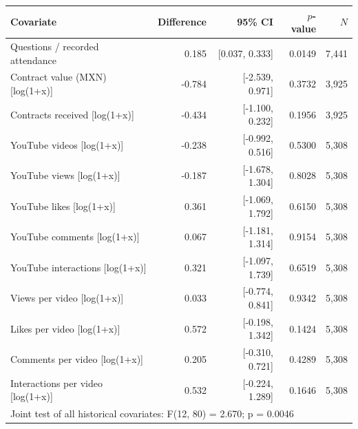 \begin{tabular}{lrrrr}
\toprule
Covariate & Difference & 95\% CI & $p$-value & $N$ \\
\midrule
Questions / recorded attendance & 0.185 & [0.037, 0.333] & 0.0149 & 7,441 \\
Contract value (MXN) [log(1+x)] & -0.784 & [-2.539, 0.971] & 0.3732 & 3,925 \\
Contracts received [log(1+x)] & -0.434 & [-1.100, 0.232] & 0.1956 & 3,925 \\
YouTube videos [log(1+x)] & -0.238 & [-0.992, 0.516] & 0.5300 & 5,308 \\
YouTube views [log(1+x)] & -0.187 & [-1.678, 1.304] & 0.8028 & 5,308 \\
YouTube likes [log(1+x)] & 0.361 & [-1.069, 1.792] & 0.6150 & 5,308 \\
YouTube comments [log(1+x)] & 0.067 & [-1.181, 1.314] & 0.9154 & 5,308 \\
YouTube interactions [log(1+x)] & 0.321 & [-1.097, 1.739] & 0.6519 & 5,308 \\
Views per video [log(1+x)] & 0.033 & [-0.774, 0.841] & 0.9342 & 5,308 \\
Likes per video [log(1+x)] & 0.572 & [-0.198, 1.342] & 0.1424 & 5,308 \\
Comments per video [log(1+x)] & 0.205 & [-0.310, 0.721] & 0.4289 & 5,308 \\
Interactions per video [log(1+x)] & 0.532 & [-0.224, 1.289] & 0.1646 & 5,308 \\
\midrule
\multicolumn{5}{l}{Joint test of all historical covariates: F(12, 80) = 2.670; p = 0.0046} \\
\bottomrule
\end{tabular}
